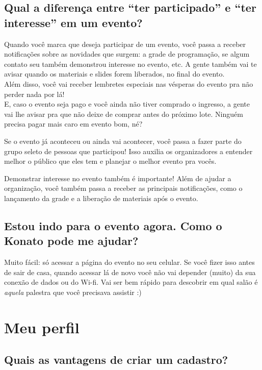 \documentclass[12pt,a4paper,twoside,hyphens,english,brazil]{abntex2}
\newcommand{\adiado}{{\color{Bittersweet}\framebox[1.1\width]{ADIADO}}}
\begin{document}
{\subsection[Diferença entre participação e interesse no evento]{Qual a diferença entre ``ter participado'' e ``ter interesse'' em um evento?} \label{faq:participar}
Quando você marca que deseja participar de um evento, você passa a receber notificações sobre as novidades que surgem: a grade de programação, se algum contato seu também demonstrou interesse no evento, etc. A gente também vai te avisar quando os materiais e slides forem liberados, no final do evento.\\
Além disso, você vai receber lembretes especiais nas vésperas do evento pra não perder nada por lá!\\
E, caso o evento seja pago e você ainda não tiver comprado o ingresso, a gente vai lhe avisar pra que não deixe de comprar antes do próximo lote. Ninguém precisa pagar mais caro em evento bom, né?

Se o evento já aconteceu ou ainda vai acontecer, você passa a fazer parte do grupo seleto de pessoas que participou! Isso auxilia os organizadores a entender melhor o público que eles tem e planejar o melhor evento pra vocês.

Demonstrar interesse no evento também é importante! Além de ajudar a organização, você também passa a receber as principais notificações, como o lançamento da grade e a liberação de materiais após o evento.

\subsection{Estou indo para o evento agora. Como o Konato pode me ajudar?} \label{faq:hoje}
\adiado{} Muito fácil: só acessar a página do evento no seu celular. Se você fizer isso antes de sair de casa, quando acessar lá de novo você não vai depender (muito) da sua conexão de dados ou do Wi-fi. Vai ser bem rápido para descobrir em qual salão é \emph{aquela} palestra que você precisava assistir :)


\section{Meu perfil} %
\subsection{Quais as vantagens de criar um cadastro?} \label{faq:vantagens}

}
\end{document}
